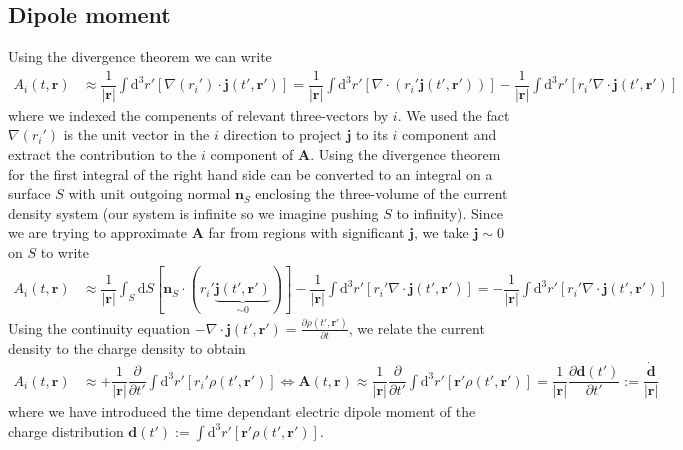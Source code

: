 \documentclass[10pt, a4paper]{article}
\begin{document}
{\subsection{Dipole moment}
Using the divergence theorem we can write 
\begin{align*}
    A_i(t, \mathbf{r}) &\approx \dfrac{1}{|\mathbf{r}|} \int \text{d}^3r' \left[\nabla(r_i') \cdot \mathbf{j}(t', \mathbf{r}')\right] = \dfrac{1}{|\mathbf{r}|} \int \text{d}^3r' \left[\nabla \cdot(r_i'  \mathbf{j}(t', \mathbf{r}'))\right]-\dfrac{1}{|\mathbf{r}|} \int \text{d}^3r' \left[r_i' \nabla \cdot \mathbf{j}(t', \mathbf{r}')\right]
\end{align*}
where we indexed the compenents of relevant three-vectors by $i$. We used the fact $\nabla(r_i')$ is the unit vector in the $i$ direction to project $\mathbf{j}$ to its $i$ component and extract the contribution to the $i$ component of $\mathbf{A}$. Using the divergence theorem for the first integral of the right hand side can be converted to an integral on a surface $S$ with unit outgoing normal $\mathbf{n}_S$ enclosing the three-volume of the current density system (our system is infinite so we imagine pushing $S$ to infinity). Since we are trying to approximate $\mathbf{A}$ far from regions with significant $\mathbf{j}$, we take $\mathbf{j} \sim 0$ on $S$ to write 
\begin{align*}
    A_i(t, \mathbf{r}) &\approx \dfrac{1}{|\mathbf{r}|} \int_S \text{d}S [\mathbf{n}_S \cdot (r_i'  \underbrace{\mathbf{j}(t', \mathbf{r}')}_{\sim 0})]-\dfrac{1}{|\mathbf{r}|} \int \text{d}^3r' \left[r_i' \nabla \cdot \mathbf{j}(t', \mathbf{r}')\right] = -\dfrac{1}{|\mathbf{r}|} \int \text{d}^3r' \left[r_i' \nabla \cdot \mathbf{j}(t', \mathbf{r}')\right] 
\end{align*}
Using the continuity equation $-\nabla \cdot \mathbf{j}(t', \mathbf{r}') = \frac{\partial \rho(t', \mathbf{r}')}{\partial t}$, we relate the current density to the charge density to obtain
\begin{align*}
    A_i(t, \mathbf{r}) &\approx +\dfrac{1}{|\mathbf{r}|} \dfrac{\partial}{\partial t'}\int \text{d}^3r' \left[r_i' \rho(t', \mathbf{r}')\right] \iff \mathbf{A}(t, \mathbf{r}) \approx \dfrac{1}{|\mathbf{r}|} \dfrac{\partial}{\partial t'}\int \text{d}^3r' \left[\mathbf{r}' \rho(t', \mathbf{r}')\right]= \dfrac{1}{|\mathbf{r}|}\dfrac{\partial\mathbf{d}(t')}{\partial t'} := \dfrac{\dot{\mathbf{d}}}{|\mathbf{r}|}
\end{align*}
where we have introduced the time dependant electric dipole moment of the charge distribution $\mathbf{d}(t') := \int \text{d}^3r' \left[\mathbf{r}' \rho(t', \mathbf{r}')\right]$.


}
\end{document}
